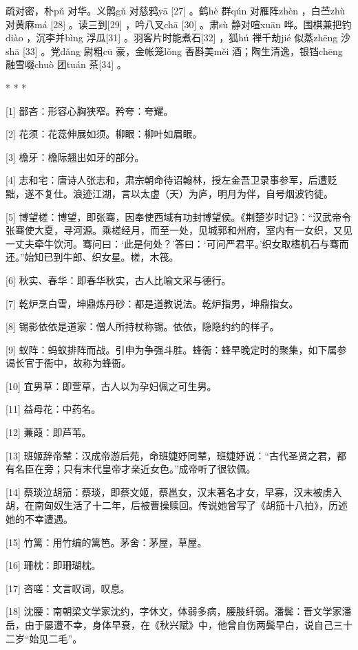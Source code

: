 \documentclass[12pt,UTF8]{ctexbook}
\begin{document}
疏对密，朴pǔ 对华。义鹘gǔ 对慈鸦yā [27] 。鹤hè 群qún 对雁阵zhèn ，白苎zhù 对黄麻má [28] 。读三到[29] ，吟八叉chā [30] 。肃sù 静对喧xuān 哗。围棋兼把钓diào ，沉李并bìng 浮瓜[31] 。羽客片时能煮石[32] ，狐hú 禅千劫jié 似蒸zhēng 沙shā [33] 。党dǎng 尉粗cū 豪，金帐笼lǒng 香斟美měi 酒；陶生清逸，银铛chēng 融雪啜chuò 团tuán 茶[34] 。



* * *



[1] 鄙吝：形容心胸狭窄。矜夸：夸耀。

[2] 花须：花蕊伸展如须。柳眼：柳叶如眉眼。

[3] 檐牙：檐际翘出如牙的部分。

[4] 志和宅：唐诗人张志和，肃宗朝命待诏翰林，授左金吾卫录事参军，后遭贬黜，遂不复仕。浪迹江湖，言以太虚（天）为庐，明月为伴，自号烟波钓徒。

[5] 博望槎：博望，即张骞，因奉使西域有功封博望侯。《荆楚岁时记》：“汉武帝令张骞使大夏，寻河源。乘槎经月，而至一处，见城郭和州府，室内有一女织，又见一丈夫牵牛饮河。骞问曰：‘此是何处？’答曰：‘可问严君平。’织女取榰机石与骞而还。”始知已到牛郎、织女星。槎，木筏。

[6] 秋实、春华：即春华秋实，古人比喻文采与德行。

[7] 乾炉烹白雪，坤鼎炼丹砂：都是道教说法。乾炉指男，坤鼎指女。

[8] 锡影依依是道家：僧人所持杖称锡。依依，隐隐约约的样子。

[9] 蚁阵：蚂蚁排阵而战。引申为争强斗胜。蜂衙：蜂早晚定时的聚集，如下属参谒长官于衙中，故称为蜂衙。

[10] 宜男草：即萱草，古人以为孕妇佩之可生男。

[11] 益母花：中药名。

[12] 蒹葭：即芦苇。

[13] 班姬辞帝辇：汉成帝游后苑，命班婕妤同辇，班婕妤说：“古代圣贤之君，都有名臣在旁；只有末代皇帝才亲近女色。”成帝听了很钦佩。

[14] 蔡琰泣胡笳：蔡琰，即蔡文姬，蔡邕女，汉末著名才女，早寡，汉末被虏入胡，在南匈奴生活了十二年，后被曹操赎回。传说她曾写了《胡笳十八拍》，历述她的不幸遭遇。

[15] 竹篱：用竹编的篱笆。茅舍：茅屋，草屋。

[16] 珊枕：即珊瑚枕。

[17] 咨嗟：文言叹词，叹息。

[18] 沈腰：南朝梁文学家沈约，字休文，体弱多病，腰肢纤弱。潘鬓：晋文学家潘岳，由于屡遭不幸，身体早衰，在《秋兴赋》中，他曾自伤两鬓早白，说自己三十二岁“始见二毛”。
\end{document}
